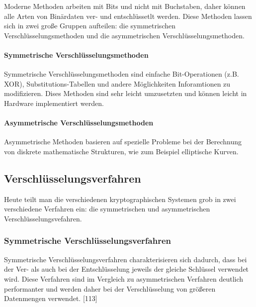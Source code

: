 \documentclass[12pt,a4paper]{report}
\begin{document}
\begin{onehalfspace}
Moderne Methoden arbeiten mit Bits und nicht mit Buchstaben, daher können alle Arten von Binärdaten ver- und entschlüssetlt werden. Diese Methoden lassen sich in zwei große Gruppen aufteilen: die symmetrischen Verschlüsselungsmethoden und die asymmetrischen Verschlüsselungsmethoden.

\paragraph{Symmetrische Verschlüsselungsmethoden}

Symmetrische Verschlüsselungsmethoden sind einfache Bit-Operationen (z.B. XOR), Substitutions-Tabellen und andere Möglichkeiten Inforamtionen zu modifizieren. Dises Methoden sind sehr leicht umzusetzten und können leicht in Hardware implementiert werden.

\paragraph{Asymmetrische Verschlüsselungsmethoden} 

Asymmetrische Methoden basieren auf spezielle Probleme bei der Berechnung von diskrete mathematische Strukturen, wie zum Beispiel elliptische Kurven.

\subsection{Verschlüsselungsverfahren}

Heute teilt man die verschiedenen kryptographischen Systemen grob in zwei verschiedene Verfahren ein: die symmetrischen und asymmetrischen Verschlüsselungsvefahren.

\subsubsection{Symmetrische Verschlüsselungsverfahren}

Symmetrische Verschlüsselungsverfahren charakterisieren sich dadurch, dass bei der Ver- als auch bei der Entschlüsselung jeweils der gleiche Schlüssel verwendet wird. Diese Verfahren sind im Vergleich zu asymmetrischen Verfahren deutlich performanter und werden daher bei der Verschlüsselung von größeren Datenmengen verwendet. [113]\\


\end{onehalfspace}
\end{document}
